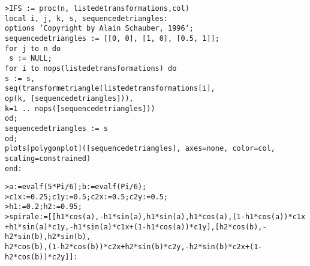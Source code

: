 	\texttt{>IFS := proc(n, liste\textunderscore de\textunderscore transformations,col)}\\
     \texttt{local i, j, k, s, sequence\textunderscore de\textunderscore triangles:}\\
     \texttt{options `Copyright by Alain Schauber, 1996`;}\\
     \texttt{sequence\textunderscore de\textunderscore triangles := [[0, 0], [1, 0], [0.5, 1]];}\\
     \texttt{for j to n do}\\
     \texttt{ s := NULL;}\\
     \texttt{for i to nops(liste\textunderscore de\textunderscore transformations) do}\\
        \texttt{s := s,}\\
        \texttt{seq(transforme\textunderscore triangle(liste\textunderscore de\textunderscore transformations[i],}\\
        \texttt{op(k, [sequence\textunderscore de\textunderscore triangles])),}\\
        \texttt{k=1 .. nops([sequence\textunderscore de\textunderscore triangles]))}\\
       \texttt{od;}\\
      \texttt{sequence\textunderscore de\textunderscore triangles := s}\\
     \texttt{od;}\\
    \texttt{plots[polygonplot]([sequence\textunderscore de\textunderscore triangles], axes=none, color=col, scaling=constrained)}\\
  \texttt{end:}

  \texttt{>a:=evalf(5*Pi/6);b:=evalf(Pi/6);}\\
  \texttt{>c1x:=0.25;c1y:=0.5;c2x:=0.5;c2y:=0.5;}\\
  \texttt{>h1:=0.2;h2:=0.95;}\\
  \texttt{>spirale:=[[h1*cos(a),-h1*sin(a),h1*sin(a),h1*cos(a),(1-h1*cos(a))*c1x}\\
  \texttt{+h1*sin(a)*c1y,-h1*sin(a)*c1x+(1-h1*cos(a))*c1y],[h2*cos(b),-h2*sin(b),h2*sin(b),}\\
  \texttt{h2*cos(b),(1-h2*cos(b))*c2x+h2*sin(b)*c2y,-h2*sin(b)*c2x+(1-h2*cos(b))*c2y]]:}\\

